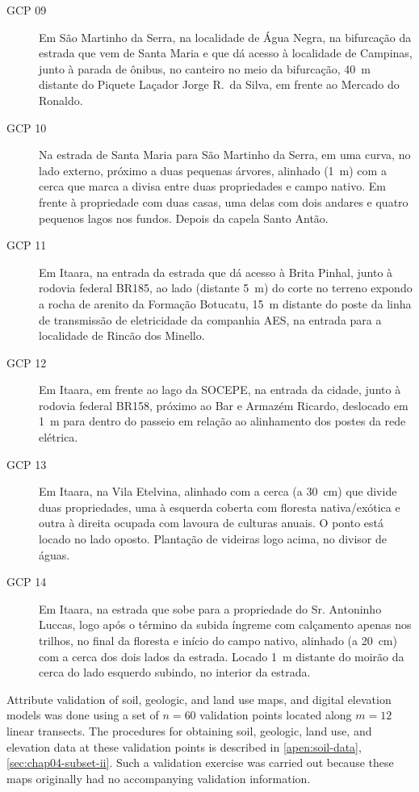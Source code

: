 \begin{description}
 \item [GCP 09] Em São Martinho da Serra, na localidade de Água Negra, na bifurcação da estrada que vem de
 Santa Maria e que dá acesso à localidade de Campinas, junto à parada de ônibus, no canteiro no meio da
 bifurcação, \SI{40}{\m} distante do Piquete Laçador Jorge R.~da Silva, em frente ao Mercado do Ronaldo.
 
 \item [GCP 10] Na estrada de Santa Maria para São Martinho da Serra, em uma curva, no lado externo, próximo a
 duas pequenas árvores, alinhado (\SI{1}{\m}) com a cerca que marca a divisa entre duas propriedades e campo
 nativo. Em frente à propriedade com duas casas, uma delas com dois andares e quatro pequenos lagos nos
 fundos. Depois da capela Santo Antão.
 
 \item [GCP 11] Em Itaara, na entrada da estrada que dá acesso à Brita Pinhal, junto à rodovia federal BR185,
 ao lado (distante \SI{5}{\m}) do corte no terreno expondo a rocha de arenito da Formação Botucatu,
 \SI{15}{\m} distante do poste da linha de transmissão de eletricidade da companhia AES, na entrada para a
 localidade de Rincão dos Minello.
 
 \item [GCP 12] Em Itaara, em frente ao lago da SOCEPE, na entrada da cidade, junto à rodovia federal BR158,
 próximo ao Bar e Armazém Ricardo, deslocado em \SI{1}{\m} para dentro do passeio em relação ao alinhamento 
 dos postes da rede elétrica.
 
 \item [GCP 13] Em Itaara, na Vila Etelvina, alinhado com a cerca (a \SI{30}{\cm}) que divide duas 
propriedades, uma à 
 esquerda coberta com floresta nativa/exótica e outra à direita ocupada com lavoura de culturas anuais. O 
ponto 
está 
 locado no lado oposto. Plantação de videiras logo acima, no divisor de águas.
 
 \item [GCP 14] Em Itaara, na estrada que sobe para a propriedade do Sr. Antoninho Luccas, logo após o término 
 da subida íngreme com calçamento apenas nos trilhos, no final da floresta e início do campo nativo, alinhado 
 (a \SI{20}{\cm}) com a cerca dos dois lados da estrada. Locado \SI{1}{\m} distante do moirão da cerca do 
 lado esquerdo subindo, no interior da estrada.
\end{description}

Attribute validation of soil, geologic, and land use maps, and digital elevation models was done using a set 
of 
$n = 60$ 
validation points located along $m = 12$ linear transects. The procedures for obtaining soil, geologic, land 
use, and elevation data at these validation points is described in \autoref{apen:soil-data}, 
\autoref{sec:chap04-subset-ii}. Such a validation exercise was carried out because these maps originally had 
no 
accompanying validation information.


